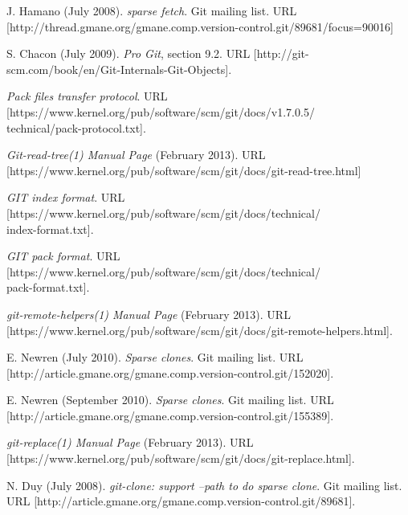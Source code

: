 \documentclass[preprint]{sigplanconf}
\begin{document}
\begin{thebibliography}{10}
    \softraggedright

     J. Hamano (July 2008).
    \newblock \emph{sparse fetch}.
    \newblock Git mailing list.
    \newblock URL
    [http://thread.gmane.org/gmane.comp.version-control.git/89681/focus=90016]

     S. Chacon (July 2009).
    \newblock\emph{Pro Git}, section 9.2.
    \newblock URL
    [http://git-scm.com/book/en/Git-Internals-Git-Objects].

     \emph{Pack files transfer protocol}.
    \newblock URL
    [https://www.kernel.org/pub/software/scm/git/docs/v1.7.0.5/\\
      technical/pack-protocol.txt].

     \emph{Git-read-tree(1) Manual Page} (February 2013).
    \newblock URL
    [https://www.kernel.org/pub/software/scm/git/docs/git-read-tree.html]

     \emph{GIT index format}.
    \newblock URL
    [https://www.kernel.org/pub/software/scm/git/docs/technical/\\
    index-format.txt].

     \emph{GIT pack format}.
    \newblock URL
    [https://www.kernel.org/pub/software/scm/git/docs/technical/\\
    pack-format.txt].

     \emph{git-remote-helpers(1) Manual Page}
        (February 2013).
    \newblock URL
    [https://www.kernel.org/pub/software/scm/git/docs/git-remote-helpers.html].

    E. Newren (July 2010).
    \newblock \emph{Sparse clones}.
    \newblock Git mailing list.
    \newblock URL
    [http://article.gmane.org/gmane.comp.version-control.git/152020].

    E. Newren (September 2010).
    \newblock \emph{Sparse clones}.
    \newblock Git mailing list.
    \newblock URL
    [http://article.gmane.org/gmane.comp.version-control.git/155389].

     \emph{git-replace(1) Manual Page} (February 2013).
    \newblock URL
    [https://www.kernel.org/pub/software/scm/git/docs/git-replace.html].

    N. Duy (July 2008).
    \newblock \emph{git-clone: support --path to do sparse clone}.
    \newblock Git mailing list.
    \newblock URL
    [http://article.gmane.org/gmane.comp.version-control.git/89681].


\end{thebibliography}
\end{document}
